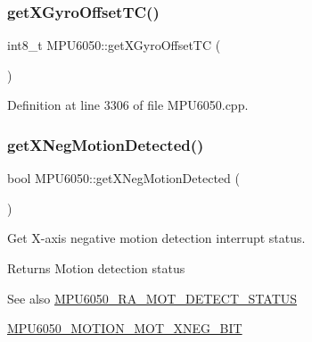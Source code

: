 \subsubsection{\texorpdfstring{getXGyroOffsetTC()}{getXGyroOffsetTC()}}
{\footnotesize\ttfamily int8\+\_\+t M\+P\+U6050\+::get\+X\+Gyro\+Offset\+TC (\begin{DoxyParamCaption}{ }\end{DoxyParamCaption})}



Definition at line 3306 of file M\+P\+U6050.\+cpp.


\begin{DoxyCode}{0}

\end{DoxyCode}
\mbox{\label{classMPU6050_a446d235905783c5b90637a6b6792ac76}} 
\subsubsection{\texorpdfstring{getXNegMotionDetected()}{getXNegMotionDetected()}}
{\footnotesize\ttfamily bool M\+P\+U6050\+::get\+X\+Neg\+Motion\+Detected (\begin{DoxyParamCaption}{ }\end{DoxyParamCaption})}

Get X-\/axis negative motion detection interrupt status. \begin{DoxyReturn}{Returns}
Motion detection status 
\end{DoxyReturn}
\begin{DoxySeeAlso}{See also}
\mbox{\hyperlink{MPU6050_8h_a5b725ca4941b1a73f8e4df3d7164d514}{M\+P\+U6050\+\_\+\+R\+A\+\_\+\+M\+O\+T\+\_\+\+D\+E\+T\+E\+C\+T\+\_\+\+S\+T\+A\+T\+US}} 

\mbox{\hyperlink{MPU6050_8h_a4aad48766db4bb295d0d1f4a7857b8c3}{M\+P\+U6050\+\_\+\+M\+O\+T\+I\+O\+N\+\_\+\+M\+O\+T\+\_\+\+X\+N\+E\+G\+\_\+\+B\+IT}} 
\end{DoxySeeAlso}


